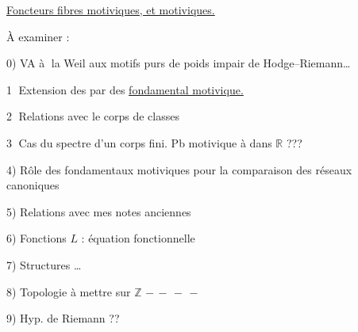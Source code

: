 
\uline{Foncteurs fibres motiviques, et   motiviques.}

À examiner :

0) VA \textcircled{à la Weil}  aux motifs purs de poids impair 
 de Hodge--Riemann\ldots

\textcircled{1} Extension des   par des 
\uline{ fondamental motivique.}

\textcircled{2} Relations avec le corps de classes

\textcircled{3} Cas du spectre d'un corps fini. Pb motivique
 à  dans $\mathbb{R}$ ???

\margin{*}
4) Rôle des  fondamentaux motiviques pour la comparaison des réseaux canoniques

5) Relations  avec mes notes anciennes

6) Fonctions $L$ : équation fonctionnelle

7) Structures \ldots

8) Topologie à mettre sur $\mathbb{Z}$ $-\, -\, -\, -$

9) Hyp. de Riemann ??



